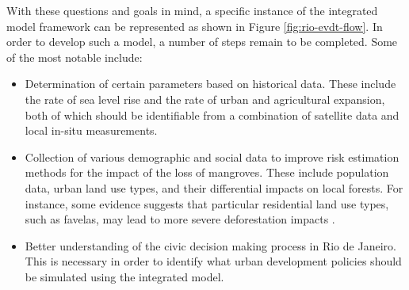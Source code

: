 %

With these questions and goals in mind, a specific instance of the integrated model framework can be represented as shown in Figure \ref{fig:rio-evdt-flow}. In order to develop such a model, a number of steps remain to be completed. Some of the most notable include:

\begin{itemize}[itemsep=0pt,parsep=0pt]
    \item Determination of certain parameters based on historical data. These include the rate of sea level rise and the rate of urban and agricultural expansion, both of which should be identifiable from a combination of satellite data and local in-situ measurements.
    \item Collection of various demographic and social data to improve risk estimation methods for the impact of the loss of mangroves. These include population data, urban land use types, and their differential impacts on local forests. For instance, some evidence suggests that particular residential land use types, such as favelas, may lead to more severe deforestation impacts \cite{herzogLocalAssessmentRio2013}.
    \item Better understanding of the civic decision making process in Rio de Janeiro. This is necessary in order to identify what urban development policies should be simulated using the integrated model.
\end{itemize}


